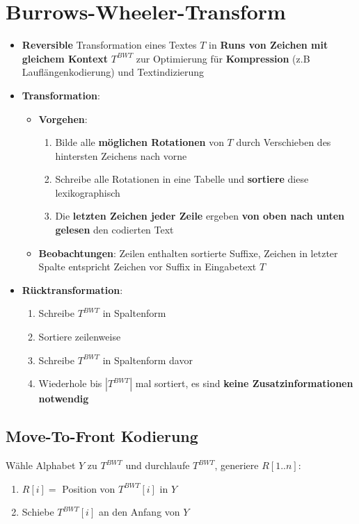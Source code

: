 \section{Burrows-Wheeler-Transform}%
\label{bwt:sec:burrows_wheeler_transform}

\begin{itemize}
	\item \textbf{Reversible} Transformation eines Textes $T$ in \textbf{Runs von Zeichen mit gleichem Kontext} $T^{BWT}$ zur Optimierung für \textbf{Kompression} (z.B Lauflängenkodierung) und Textindizierung
	\item \textbf{Transformation}:
	\begin{itemize}
		\item \textbf{Vorgehen}:
		\begin{enumerate}
			\item Bilde alle \textbf{möglichen Rotationen} von $T$ durch Verschieben des hintersten Zeichens nach vorne
			\item Schreibe alle Rotationen in eine Tabelle und \textbf{sortiere} diese lexikographisch
			\item Die \textbf{letzten Zeichen jeder Zeile} ergeben \textbf{von oben nach unten gelesen} den codierten Text
		\end{enumerate}
		\item \textbf{Beobachtungen}: Zeilen enthalten sortierte Suffixe, Zeichen in letzter Spalte entspricht Zeichen vor Suffix in Eingabetext $T$
	\end{itemize}
	\item \textbf{Rücktransformation}:
	\begin{enumerate}
		\item Schreibe $T^{BWT}$ in Spaltenform
		\item Sortiere zeilenweise
		\item Schreibe $T^{BWT}$ in Spaltenform davor
		\item Wiederhole bis $|T^{BWT}|$ mal sortiert, es sind \textbf{keine Zusatzinformationen notwendig}
	\end{enumerate}
\end{itemize}

\subsection{Move-To-Front Kodierung}%
\label{bwt:sub:move_to_front_kodierung}

Wähle Alphabet $Y$ zu $T^{BWT}$ und durchlaufe $T^{BWT}$, generiere $R[1..n]$:
\begin{enumerate}
	\item $R[i] = $ Position von $T^{BWT}[i]$ in $Y$
	\item Schiebe $T^{BWT}[i]$ an den Anfang von $Y$
\end{enumerate}

